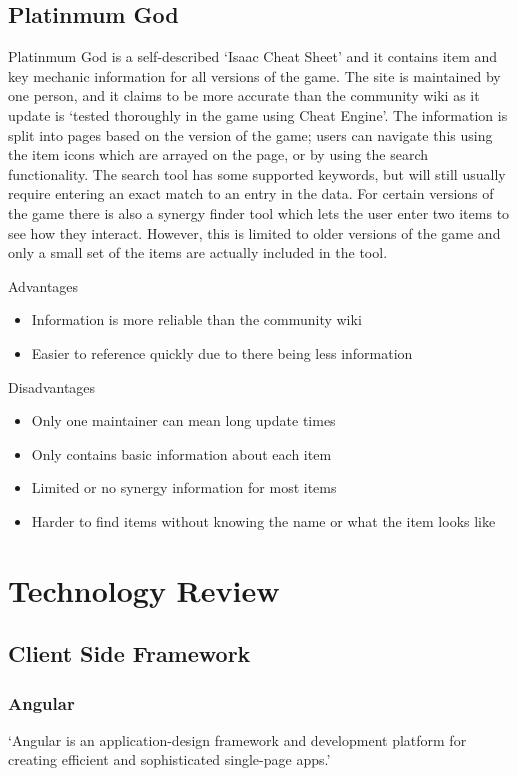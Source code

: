 \subsection*{Platinmum God}
Platinmum God is a self-described `Isaac Cheat Sheet'\cite{IsaacCheatSheet} and it contains item and key mechanic 
information for all versions of the game. The site is maintained by one person, and it claims to be more accurate than 
the community wiki as it update is `tested thoroughly in the game using Cheat Engine'\cite{FrequentlyAskedQuestions}. 
The information is split into pages based on the version of the game; users can navigate this using the item icons which
 are arrayed on the page, or by using the search functionality. The search tool has some supported keywords, but will 
still usually require entering an exact match to an entry in the data. For certain versions of the game there is also a 
synergy finder tool which lets the user enter two items to see how they interact. However, this is limited to older 
versions of the game and only a small set of the items are actually included in the tool. \par
Advantages
\begin{itemize}
    \item Information is more reliable than the community wiki
    \item Easier to reference quickly due to there being less information
\end{itemize}
Disadvantages
\begin{itemize}
    \item Only one maintainer can mean long update times
    \item Only contains basic information about each item
    \item Limited or no synergy information for most items
    \item Harder to find items without knowing the name or what the item looks like
\end{itemize}
\section{Technology Review}
\subsection{Client Side Framework}
\subsubsection*{Angular}
`Angular is an application-design framework and development platform for creating efficient and sophisticated 
single-page apps.'\cite{AngularIntroductionAngular}
